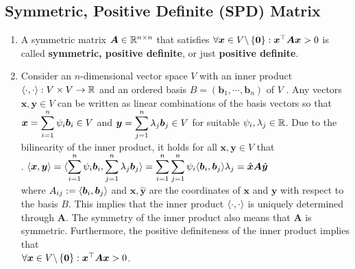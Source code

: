 \subsection{Symmetric, Positive Definite (SPD) Matrix}

\begin{enumerate}
    \item 
    \begin{definition}
        A symmetric matrix $\bm{A} \in \mathbb{R}^{n\times n}$ that satisfies $\forall \bm{x} \in V \backslash \left\{\bm{0}\right\} : \bm{x}^\top \bm{Ax} > 0$ is called \textbf{symmetric, positive definite}, or just \textbf{positive definite}.
        \hfill \cite{mfml/book/mml/Deisenroth-Faisal-Ong}
    \end{definition}

    \item Consider an $n$-dimensional vector space $V$ with an inner product $\langle\cdot, \cdot\rangle : V \times V \to \mathbb{R}$ and an ordered basis $B = (\bm{b}_1, \cdots , \bm{b}_n)$ of $V$ . 
    Any vectors $\bm{x}, \bm{y} \in  V$ can be written as linear combinations of the basis vectors so that $\bm{x} = \displaystyle\sum^n _{i=1} \psi _i \bm{b}_i \in  V$ and $\bm{y} = \displaystyle\sum ^n _{j=1} \lambda _j \bm{b}_j \in  V$ for suitable $\psi _i , \lambda _j \in  \mathbb{R}$. 
    Due to the bilinearity of the inner product, it holds for all $\bm{x}, \bm{y} \in  V$ that
    \hfill \cite{mfml/book/mml/Deisenroth-Faisal-Ong}
    \\
    .\hfill
    $
        \langle\bm{x}, \bm{y}\rangle
        = \langle
            \displaystyle\sum^n _{i=1} \psi _i \bm{b}_i,
            \displaystyle\sum ^n _{j=1} \lambda _j \bm{b}_j
        \rangle
        = \displaystyle\sum^n _{i=1} \displaystyle\sum ^n _{j=1} \psi _i \langle\bm{b}_i, \bm{b}_j\rangle \lambda _j
        = \hat{\bm{x}} \bm{A} \hat{\bm{y}}
    $
    \hfill \cite{mfml/book/mml/Deisenroth-Faisal-Ong}
    \\
    where $A_{ij} := \langle\bm{b}_i , \bm{b}_j\rangle$ and $\hat{\bm{x}}, \hat{\bm{y}}$ are the coordinates of $\bm{x}$ and $\bm{y}$ with respect to the basis $B$.
    This implies that the inner product $\langle\cdot, \cdot\rangle$ is uniquely determined through $\bm{A}$. 
    The symmetry of the inner product also means that $\bm{A}$ is symmetric. 
    Furthermore, the positive definiteness of the inner product implies that
    \\
    $\forall \bm{x} \in V \backslash \left\{\bm{0}\right\} : \bm{x}^\top \bm{Ax} > 0$.
    \hfill \cite{mfml/book/mml/Deisenroth-Faisal-Ong}


\end{enumerate}
